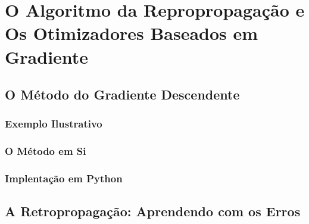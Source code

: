 
\chapter{O Algoritmo da Repropropagação e Os Otimizadores Baseados em Gradiente}
\label{cap:retropropagacao-gradiente}



\section{O Método do Gradiente Descendente}

\subsection{Exemplo Ilustrativo}

\subsection{O Método em Si}

\subsection{Implentação em Python}


\section{A Retropropagação: Aprendendo com os Erros}



